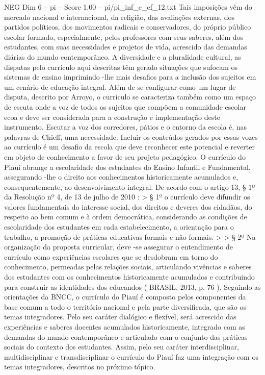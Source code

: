 \begin{textsample}{NEG Dim 6 – pi – Score 1.00 – pi/pi\_inf\_e\_ef\_12.txt}
Tais imposições vêm do mercado nacional e internacional, da religião, das avaliações externas, dos partidos políticos, dos movimentos radicais e conservadores, do próprio público escolar formado, especialmente, pelos professores com seus saberes, além dos estudantes, com suas necessidades e projetos de vida, acrescido das demandas diárias do mundo contemporâneo.
A diversidade e a pluralidade cultural, as disputas pelo currículo aqui descritas têm gerado situações que sufocam os sistemas de ensino imprimindo -lhe mais desafios para a inclusão dos sujeitos em um cenário de educação integral.
Além de se configurar como um lugar de disputa, descrito por Arroyo, o currículo se caracteriza também como um espaço de escuta onde a voz de todos os sujeitos que compõem a comunidade escolar ecoa e deve ser considerada para a construção e implementação deste instrumento.
Escutar a voz dos corredores, pátios e o entorno da escola é, nas palavras de Chieff, uma necessidade.
Incluir os conteúdos gerados por essas vozes ao currículo é um desafio da escola que deve reconhecer este potencial e reverter em objeto de conhecimento a favor de seu projeto pedagógico.
O currículo do Piauí abrange a escolaridade dos estudantes do Ensino Infantil e Fundamental, assegurando -lhe o direito aos conhecimentos historicamente acumulados e, consequentemente, ao desenvolvimento integral.
De acordo com o artigo 13, § 1º da Resolução nº 4, de 13 de julho de 2010 : > § 1º o currículo deve difundir os valores fundamentais do interesse social, dos direitos e deveres dos cidadãos, do respeito ao bem comum e à ordem democrática, considerando as condições de escolaridade dos estudantes em cada estabelecimento, a orientação para o trabalho, a promoção de práticas educativas formais e não formais. > > § 2º Na organização da proposta curricular, deve -se assegurar o entendimento de currículo como experiências escolares que se desdobram em torno do conhecimento, permeadas pelas relações sociais, articulando vivências e saberes dos estudantes com os conhecimentos historicamente acumulados e contribuindo para construir as identidades dos educandos ( BRASIL, 2013, p. 76 ).
Seguindo as orientações da BNCC, o currículo do Piauí é composto pelos componentes da base comum a todo o território nacional e pela parte diversificada, que são os temas integradores.
Pelo seu caráter dialógico e flexível, será acrescido das experiências e saberes docentes acumulados historicamente, integrado com as demandas do mundo contemporâneo e articulado com o conjunto das práticas sociais do contexto dos estudantes.
Assim, pelo seu caráter interdisciplinar, multidisciplinar e transdisciplinar o currículo do Piauí faz uma integração com os temas integradores, descritos no próximo tópico.

\end{textsample}
